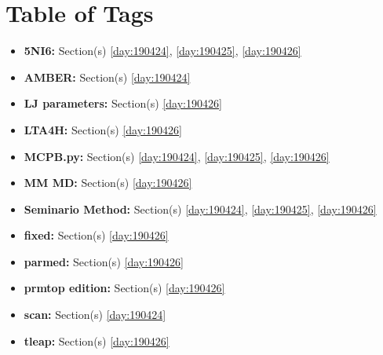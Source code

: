 \chapter{Table of Tags}
\begin{itemize}
	\item \textbf{5NI6:} Section(s) \ref{day:190424}, \ref{day:190425}, \ref{day:190426}
	\item \textbf{AMBER:} Section(s) \ref{day:190424}
	\item \textbf{LJ parameters:} Section(s) \ref{day:190426}
	\item \textbf{LTA4H:} Section(s) \ref{day:190426}
	\item \textbf{MCPB.py:} Section(s) \ref{day:190424}, \ref{day:190425}, \ref{day:190426}
	\item \textbf{MM MD:} Section(s) \ref{day:190426}
	\item \textbf{Seminario Method:} Section(s) \ref{day:190424}, \ref{day:190425}, \ref{day:190426}
	\item \textbf{fixed:} Section(s) \ref{day:190426}
	\item \textbf{parmed:} Section(s) \ref{day:190426}
	\item \textbf{prmtop edition:} Section(s) \ref{day:190426}
	\item \textbf{scan:} Section(s) \ref{day:190424}
	\item \textbf{tleap:} Section(s) \ref{day:190426}
\end{itemize}
